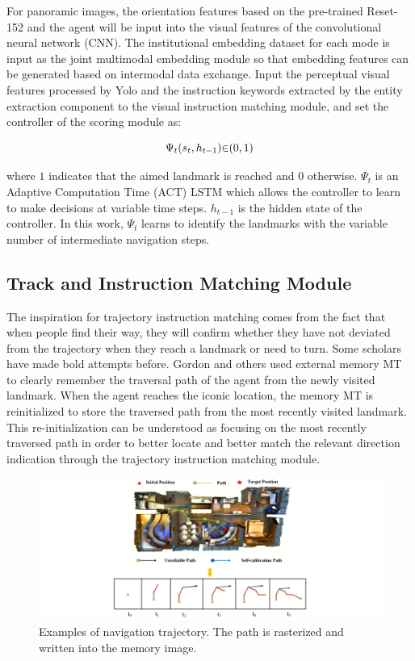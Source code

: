 For panoramic images, the orientation features based on the pre-trained Reset-152 and the agent will be input into the visual features of the convolutional neural network (CNN). The institutional embedding dataset for each mode is input as the joint multimodal embedding module so that embedding features can be generated based on intermodal data exchange. Input the perceptual visual features processed by Yolo and the instruction keywords extracted by the entity extraction component to the visual instruction matching module, and set the controller of the scoring module as:

\begin{equation}
	\centering
	{\Psi}_{t}({s}_{t},{h}_{t-1}){\in}{({0},{1})}
\end{equation}

where ${1}$ indicates that the aimed landmark is reached and ${0}$ otherwise. ${{\Psi}_{t}}$ is an Adaptive Computation Time (ACT) LSTM which allows the controller to learn to make decisions at variable time steps. ${h}_{t-1}$ is the hidden state of the controller. In this work, ${{\Psi}_{t}}$ learns to identify the landmarks with the variable number of intermediate navigation steps.

\subsection{Track and Instruction Matching Module}

The inspiration for trajectory instruction matching comes from the fact that when people find their way, they will confirm whether they have not deviated from the trajectory when they reach a landmark or need to turn. Some scholars have made bold attempts before. Gordon and others used external memory MT to clearly remember the traversal path of the agent from the newly visited landmark\cite{vasudevan2021talk2nav}. When the agent reaches the iconic location, the memory MT is reinitialized to store the traversed path from the most recently visited landmark. This re-initialization can be understood as focusing on the most recently traversed path in order to better locate and better match the relevant direction indication through the trajectory instruction matching module.

\begin{figure}[h]
	\centering
	\includegraphics[scale=1]{image06.png}
	\caption{Examples of navigation trajectory. The path is rasterized and written into the memory image.}
	\label{image06}
\end{figure}

